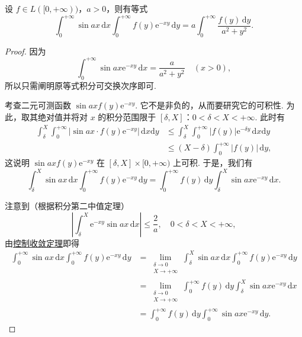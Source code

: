 \documentclass[../../main.tex]{subfiles}
\begin{document}
\begin{example}
设 \( f \in L([0, +\infty)) \)，\( a > 0 \)，则有等式
\[
\int_0^{+\infty} \sin ax \, \mathrm{d}x \int_0^{+\infty} f(y) \mathrm{e}^{-xy} \, \mathrm{d}y = a \int_0^{+\infty} \frac{f(y) \, \mathrm{d}y}{a^2 + y^2}.
\]
\end{example}
\begin{proof}
因为
\[
\int_0^{+\infty} \sin ax \mathrm{e}^{-xy} \, \mathrm{d}x = \frac{a}{a^2 + y^2} \quad (x > 0),
\]
所以只需阐明原等式积分可交换次序即可.

考查二元可测函数 \( \sin ax f(y) \mathrm{e}^{-xy} \). 它不是非负的，从而要研究它的可积性. 为此，取其绝对值并将对 \( x \) 的积分范围限于 \( [\delta, X] \)：\( 0 < \delta < X < +\infty \). 此时有
\begin{align*}
\int_{\delta}^{X} \int_0^{+\infty} |\sin ax \cdot f(y) \mathrm{e}^{-xy}| \, \mathrm{d}x\mathrm{d}y &\leqslant \int_{\delta}^{X} \int_0^{+\infty} |f(y)| \mathrm{e}^{-\delta y} \, \mathrm{d}x\mathrm{d}y \\
&\leqslant (X - \delta) \int_0^{+\infty} |f(y)| \, \mathrm{d}y,
\end{align*}
这说明 \( \sin ax f(y) \mathrm{e}^{-xy} \) 在 \( [\delta, X] \times [0, +\infty) \) 上可积. 于是，我们有
\[
\int_{\delta}^{X} \sin ax \, \mathrm{d}x \int_0^{+\infty} f(y) \mathrm{e}^{-xy} \, \mathrm{d}y = \int_0^{+\infty} f(y) \, \mathrm{d}y \int_{\delta}^{X} \sin ax \mathrm{e}^{-xy} \, \mathrm{d}x.
\]

注意到（根据积分第二中值定理）
\[
\left| \int_{\delta}^{X} \mathrm{e}^{-xy} \sin ax \, \mathrm{d}x \right| \leqslant \frac{2}{a}, \quad 0 < \delta < X < +\infty,
\]
由\hyperref[theorem:控制收敛定理]{控制收敛定理}即得
\begin{align*}
\int_0^{+\infty} \sin ax \, \mathrm{d}x \int_0^{+\infty} f(y) \mathrm{e}^{-xy} \, \mathrm{d}y &= \lim_{\substack{\delta \to 0 \\ X \to +\infty}} \int_{\delta}^{X} \sin ax \, \mathrm{d}x \int_0^{+\infty} f(y) \mathrm{e}^{-xy} \, \mathrm{d}y \\
&= \lim_{\substack{\delta \to 0 \\ X \to +\infty}} \int_0^{+\infty} f(y) \, \mathrm{d}y \int_{\delta}^{X} \sin ax \mathrm{e}^{-xy} \, \mathrm{d}x \\
&= \int_0^{+\infty} f(y) \, \mathrm{d}y \int_0^{+\infty} \sin ax \mathrm{e}^{-xy} \, \mathrm{d}y.
\end{align*}

\end{proof}
\end{document}
